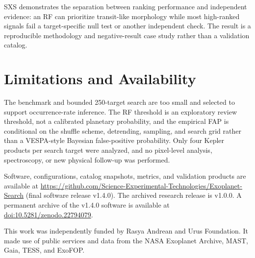 \documentclass[RNAAS]{aastex7}
\begin{document}
SXS demonstrates the separation between ranking performance and independent
evidence: an RF can prioritize transit-like morphology while most high-ranked
signals fail a target-specific null test or another independent check. The
result is a reproducible methodology and negative-result case study rather
than a validation catalog.

\section{Limitations and Availability}
The benchmark and bounded 250-target search are too small and selected to
support occurrence-rate inference. The RF threshold is an exploratory review
threshold, not a calibrated planetary probability, and the empirical FAP is
conditional on the shuffle scheme, detrending, sampling, and search grid rather
than a VESPA-style Bayesian false-positive probability. Only four Kepler
products per search target were analyzed, and no pixel-level analysis,
spectroscopy, or new physical follow-up was performed.

Software, configurations, catalog snapshots, metrics, and validation products
are available at \url{https://github.com/Science-Experimental-Technologies/Exoplanet-Search}
(final software release v1.4.0). The archived research release is v1.0.0. A
permanent archive of the v1.4.0 software is available at
\href{https://doi.org/10.5281/zenodo.22794079}{doi:10.5281/zenodo.22794079}.

\acknowledgments
This work was independently funded by Rasya Andrean and Urus Foundation. It
made use of public services and data from the NASA Exoplanet Archive, MAST,
Gaia, TESS, and ExoFOP.



\end{document}
